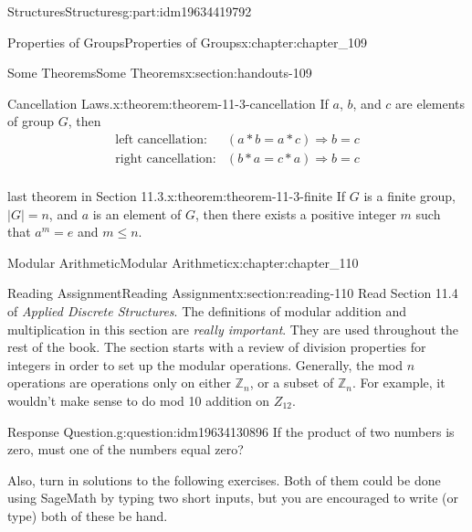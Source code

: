 \documentclass[oneside,10pt,]{book}
\numberwithin{equation}{section}
\begin{document}
\begin{partptx}{Structures}{}{Structures}{}{}{g:part:idm19634419792}
\begin{chapterptx}{Properties of Groups}{}{Properties of Groups}{}{}{x:chapter:chapter_109}
\begin{sectionptx}{Some Theorems}{}{Some Theorems}{}{}{x:section:handouts-109}
\begin{theorem}{Cancellation Laws.}{}{x:theorem:theorem-11-3-cancellation}
%
If \(a\), \(b\), and \(c\) are elements of group \(G\), then%
\begin{equation*}
\begin{array}{lc}
\textrm{left cancellation:}& (a * b = a * c)  \Rightarrow b = c\\
\textrm{right cancellation:}&  (b * a = c * a) \Rightarrow b = c\\
\end{array}
\end{equation*}
%
\end{theorem}
\begin{theorem}{last theorem in Section 11.3.}{}{x:theorem:theorem-11-3-finite}%
If \(G\) is a finite group,  \(\left| G\right| = n\), and \(a\) is an element of \(G\), then there exists a positive integer \(m\) such that \(a^m= e\) and \(m\leq n\).%
\end{theorem}
\end{sectionptx}
\end{chapterptx}
%
\typeout{************************************************}
\typeout{************************************************}
%
\begin{chapterptx}{Modular Arithmetic}{}{Modular Arithmetic}{}{}{x:chapter:chapter_110}
%
%
%
\typeout{************************************************}
\typeout{************************************************}
%
\begin{sectionptx}{Reading Assignment}{}{Reading Assignment}{}{}{x:section:reading-110}
Read Section 11.4 of \emph{Applied Discrete Structures}. The definitions of modular addition and multiplication in this section are \emph{really important}.  They are used throughout the rest of the book.  The section starts with a review of division properties for integers in order to set up the modular operations.  Generally, the mod \(n\) operations are operations only on either \(\mathbb{Z}_n\), or a subset of \(\mathbb{Z}_n\).  For example, it wouldn't make sense to do mod 10 addition on \(Z_{12}\).%
\begin{question}{Response Question.}{g:question:idm19634130896}%
If the product of two numbers is zero, must one of the numbers equal zero?%
\end{question}
Also, turn in solutions to the following exercises.  Both of them could be done using SageMath by typing two short inputs, but you are encouraged to write (or type) both of these be hand.%
%
%

\end{sectionptx}
\end{chapterptx}
\end{partptx}
\end{document}
